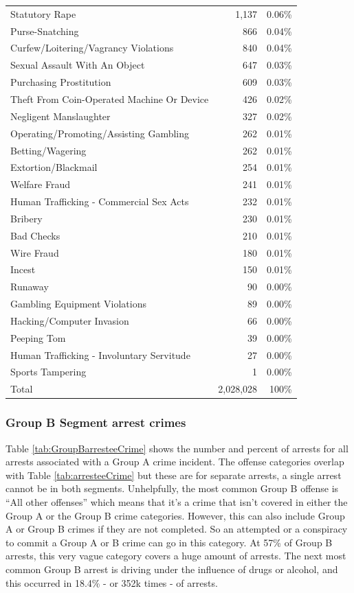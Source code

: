 \documentclass[
  12pt,
  openany]{book}
\begin{document}
\begin{longtable}[]{@{}lrr@{}}
Statutory Rape & 1,137 & 0.06\%\tabularnewline
Purse-Snatching & 866 & 0.04\%\tabularnewline
Curfew/Loitering/Vagrancy Violations & 840 & 0.04\%\tabularnewline
Sexual Assault With An Object & 647 & 0.03\%\tabularnewline
Purchasing Prostitution & 609 & 0.03\%\tabularnewline
Theft From Coin-Operated Machine Or Device & 426 & 0.02\%\tabularnewline
Negligent Manslaughter & 327 & 0.02\%\tabularnewline
Operating/Promoting/Assisting Gambling & 262 & 0.01\%\tabularnewline
Betting/Wagering & 262 & 0.01\%\tabularnewline
Extortion/Blackmail & 254 & 0.01\%\tabularnewline
Welfare Fraud & 241 & 0.01\%\tabularnewline
Human Trafficking - Commercial Sex Acts & 232 & 0.01\%\tabularnewline
Bribery & 230 & 0.01\%\tabularnewline
Bad Checks & 210 & 0.01\%\tabularnewline
Wire Fraud & 180 & 0.01\%\tabularnewline
Incest & 150 & 0.01\%\tabularnewline
Runaway & 90 & 0.00\%\tabularnewline
Gambling Equipment Violations & 89 & 0.00\%\tabularnewline
Hacking/Computer Invasion & 66 & 0.00\%\tabularnewline
Peeping Tom & 39 & 0.00\%\tabularnewline
Human Trafficking - Involuntary Servitude & 27 & 0.00\%\tabularnewline
Sports Tampering & 1 & 0.00\%\tabularnewline
Total & 2,028,028 & 100\%\tabularnewline
\bottomrule
\end{longtable}

\hypertarget{group-b-segment-arrest-crimes}{%
\subsubsection{Group B Segment arrest crimes}\label{group-b-segment-arrest-crimes}}

Table \ref{tab:GroupBarresteeCrime} shows the number and percent of arrests for all arrests associated with a Group A crime incident. The offense categories overlap with Table \ref{tab:arresteeCrime} but these are for separate arrests, a single arrest cannot be in both segments. Unhelpfully, the most common Group B offense is ``All other offenses'' which means that it's a crime that isn't covered in either the Group A or the Group B crime categories. However, this can also include Group A or Group B crimes if they are not completed. So an attempted or a conspiracy to commit a Group A or B crime can go in this category. At 57\% of Group B arrests, this very vague category covers a huge amount of arrests. The next most common Group B arrest is driving under the influence of drugs or alcohol, and this occurred in 18.4\% - or 352k times - of arrests.
\end{document}
